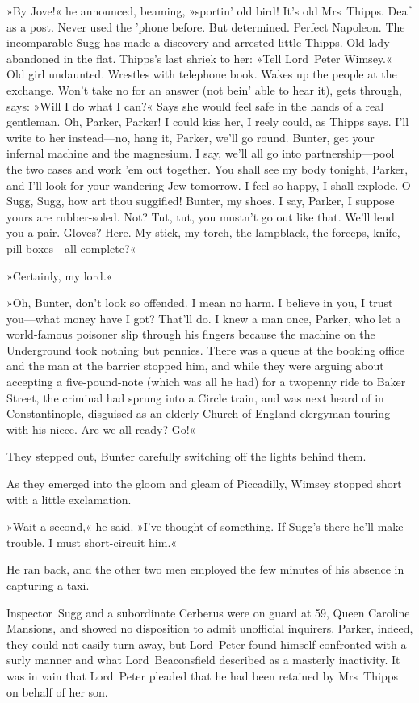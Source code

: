 »By Jove!« he announced, beaming, »sportin' old bird! It's old Mrs~Thipps. Deaf as a post. Never used the 'phone before. But determined. Perfect Napoleon. The incomparable Sugg has made a discovery and arrested little Thipps. Old lady abandoned in the flat. Thipps's last shriek to her: »Tell Lord~Peter Wimsey.« Old girl undaunted. Wrestles with telephone book. Wakes up the people at the exchange. Won't take no for an answer (not bein' able to hear it), gets through, says: »Will I do what I can?« Says she would feel safe in the hands of a real gentleman. Oh, Parker, Parker! I could kiss her, I reely could, as Thipps says. I'll write to her instead—no, hang it, Parker, we'll go round. Bunter, get your infernal machine and the magnesium. I say, we'll all go into partnership—pool the two cases and work 'em out together. You shall see my body tonight, Parker, and I'll look for your wandering Jew tomorrow. I feel so happy, I shall explode. O Sugg, Sugg, how art thou suggified! Bunter, my shoes. I say, Parker, I suppose yours are rubber-soled. Not? Tut, tut, you mustn't go out like that. We'll lend you a pair. Gloves? Here. My stick, my torch, the lampblack, the forceps, knife, pill-boxes—all complete?«

»Certainly, my lord.«

»Oh, Bunter, don't look so offended. I mean no harm. I believe in you, I trust you—what money have I got? That'll do. I knew a man once, Parker, who let a world-famous poisoner slip through his fingers because the machine on the Underground took nothing but pennies. There was a queue at the booking office and the man at the barrier stopped him, and while they were arguing about accepting a five-pound-note (which was all he had) for a twopenny ride to Baker Street, the criminal had sprung into a Circle train, and was next heard of in Constantinople, disguised as an elderly Church of England clergyman touring with his niece. Are we all ready? Go!«

They stepped out, Bunter carefully switching off the lights behind them.

As they emerged into the gloom and gleam of Piccadilly, Wimsey stopped short with a little exclamation.

»Wait a second,« he said. »I've thought of something. If Sugg's there he'll make trouble. I must short-circuit him.«

He ran back, and the other two men employed the few minutes of his absence in capturing a taxi.

Inspector~Sugg and a subordinate Cerberus were on guard at 59, Queen Caroline Mansions, and showed no disposition to admit unofficial inquirers. Parker, indeed, they could not easily turn away, but Lord~Peter found himself confronted with a surly manner and what Lord~Beaconsfield described as a masterly inactivity. It was in vain that Lord~Peter pleaded that he had been retained by Mrs~Thipps on behalf of her son.

